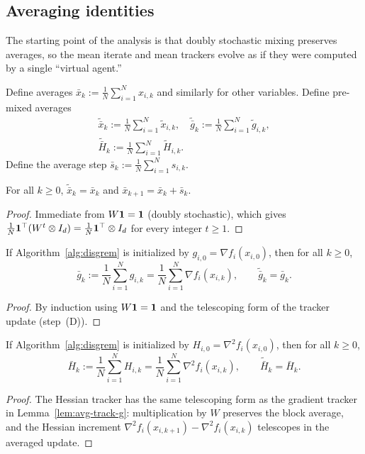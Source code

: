 \documentclass[review,onefignum,onetabnum]{siamart171218}
\begin{document}
	\subsection{Averaging identities}\label{ssec:avg}
	The starting point of the analysis is that doubly stochastic mixing
	preserves averages, so the mean iterate and mean trackers evolve as if
	they were computed by a single ``virtual agent.''
	
	Define averages $\bar x_k:=\frac1N\sum_{i=1}^N x_{i,k}$ and similarly for other variables.
	Define pre-mixed averages
	\begin{gather*}
		\tilde{\bar x}_k:=\tfrac1N\!\sum_{i=1}^N \tilde x_{i,k},\quad
		\tilde{\bar g}_k:=\tfrac1N\!\sum_{i=1}^N \tilde g_{i,k},\\
		\tilde{\bar H}_k:=\tfrac1N\!\sum_{i=1}^N \tilde H_{i,k}.
	\end{gather*}
	Define the average step $\bar s_k:=\frac1N\sum_{i=1}^N s_{i,k}$.
	
	\begin{lemma}\label{lem:avg-pres}
		For all $k\ge0$, $\tilde{\bar x}_k=\bar x_k$ and $\bar x_{k+1}=\bar x_k+\bar s_k$.
	\end{lemma}
	\begin{proof}
		Immediate from $W\mathbf{1}=\mathbf{1}$ (doubly stochastic),
		which gives $\frac1N\mathbf{1}^\top(W^t\otimes I_d)=\frac1N\mathbf{1}^\top\otimes I_d$
		for every integer $t\ge 1$.
	\end{proof}
	
	\begin{lemma}\label{lem:avg-track-g}
		If Algorithm~\ref{alg:disgrem} is initialized by
		$g_{i,0}=\nabla f_i(x_{i,0})$, then for all $k\ge0$,
		\[
		\bar g_k:=\frac1N\sum_{i=1}^N g_{i,k}=\frac1N\sum_{i=1}^N\nabla f_i(x_{i,k}),
		\qquad
		\tilde{\bar g}_k=\bar g_k.
		\]
	\end{lemma}
	\begin{proof}
		By induction using $W\mathbf{1}=\mathbf{1}$ and the telescoping form of the tracker update (step~(D)).
	\end{proof}
	
	\begin{lemma}\label{lem:avg-track-h}
		If Algorithm~\ref{alg:disgrem} is initialized by
		$H_{i,0}=\nabla^2 f_i(x_{i,0})$, then for all $k\ge0$,
		\[
		\bar H_k:=\frac1N\sum_{i=1}^N H_{i,k}=\frac1N\sum_{i=1}^N\nabla^2 f_i(x_{i,k}),
		\qquad
		\tilde{\bar H}_k=\bar H_k.
		\]
	\end{lemma}
	\begin{proof}
		The Hessian tracker has the same telescoping form as the
		gradient tracker in Lemma~\ref{lem:avg-track-g}: multiplication
		by $W$ preserves the block average, and the Hessian increment
		$\nabla^2 f_i(x_{i,k+1})-\nabla^2 f_i(x_{i,k})$ telescopes in
		the averaged update.
	\end{proof}
	
\end{document}
